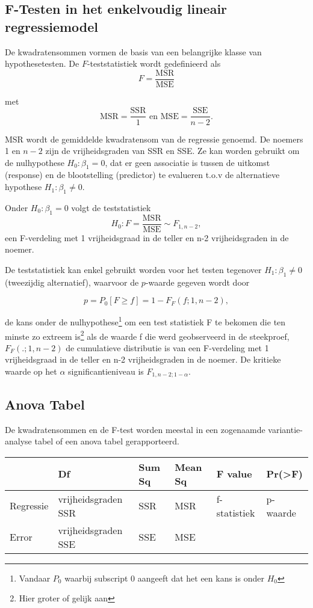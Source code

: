 \documentclass[12pt,dutch,coursenotes]{book}
\let\rmarkdownfootnote\footnote%
\def\footnote{\protect\rmarkdownfootnote}
\theoremstyle{definition}
\theoremstyle{definition}
\theoremstyle{definition}
\theoremstyle{remark}
\begin{document}
\subsection{F-Testen in het enkelvoudig lineair
regressiemodel}\label{f-testen-in-het-enkelvoudig-lineair-regressiemodel}

De kwadratensommen vormen de basis van een belangrijke klasse van
hypothesetesten. De \(F\)-teststatistiek wordt gedefinieerd als
\[  F  = \frac{\text{MSR}}{\text{MSE}}\]

met\\
\[\text{MSR} = \frac{\text{SSR}}{1} \text{ en } \text{MSE} = \frac{\text{SSE}}{n-2}.\]

MSR wordt de gemiddelde kwadratensom van de regressie genoemd. De
noemers 1 en \(n-2\) zijn de vrijheidsgraden van SSR en SSE. Ze kan
worden gebruikt om de nulhypothese \(H_0: \beta_1=0\), dat er geen
associatie is tussen de uitkomst (response) en de blootstelling
(predictor) te evalueren t.o.v de alternatieve hypothese
\(H_1: \beta_1\neq0\).

Onder \(H_0: \beta_1=0\) volgt de teststatistiek
\[H_0:F = \frac{\text{MSR}}{\text{MSE}} \sim F_{1,n-2},\] een
F-verdeling met 1 vrijheidsgraad in de teller en n-2 vrijheidsgraden in
de noemer.

De teststatistiek kan enkel gebruikt worden voor het testen tegenover
\(H_1:\beta_1\neq 0\) (tweezijdig alternatief), waarvoor de \(p\)-waarde
gegeven wordt door

\[  p = P_0\left[F\geq f\right]=1-F_F(f;1,n-2),\]

de kans onder de nulhypothese\footnote{Vandaar \(P_0\) waarbij subscript
  0 aangeeft dat het een kans is onder \(H_0\)} om een test statistiek F
te bekomen die ten minste zo extreem is\footnote{Hier groter of gelijk
  aan} als de waarde f die werd geobserveerd in de steekproef,
\(F_F(.;1,n-2)\) de cumulatieve distributie is van een F-verdeling met 1
vrijheidsgraad in de teller en n-2 vrijheidsgraden in de noemer. De
kritieke waarde op het \(\alpha\) significantieniveau is
\(F_{1,n-2;1-\alpha}\).

\subsection{Anova Tabel}\label{anova-tabel}

De kwadratensommen en de F-test worden meestal in een zogenaamde
variantie-analyse tabel of een anova tabel gerapporteerd.

\begin{longtable}[]{@{}llllll@{}}
\toprule
& Df & Sum Sq & Mean Sq & F value & Pr(\textgreater{}F)\tabularnewline
\midrule
\endhead
Regressie & vrijheidsgraden SSR & SSR & MSR & f-statistiek &
p-waarde\tabularnewline
Error & vrijheidsgraden SSE & SSE & MSE & &\tabularnewline
\bottomrule
\end{longtable}
\end{document}
